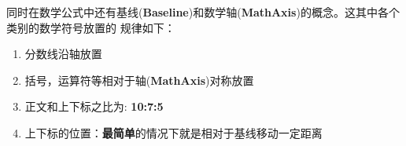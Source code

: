 \documentclass[fontset=windows, 12pt]{article}
\begin{document}
同时在数学公式中还有基线(\textbf{Baseline})和数学轴(\textbf{MathAxis})的概念。这其中各个类别的数学符号放置的
规律如下：
\begin{framed}
    \begin{enumerate}
        \item 分数线沿轴放置
        \item 括号，运算符等相对于轴(\textbf{MathAxis})对称放置
        \item 正文和上下标之比为: \textbf{10:7:5}
        \item 上下标的位置：\textbf{最简单}的情况下就是相对于基线移动一定距离
    \end{enumerate}
\end{framed}




\end{document}
